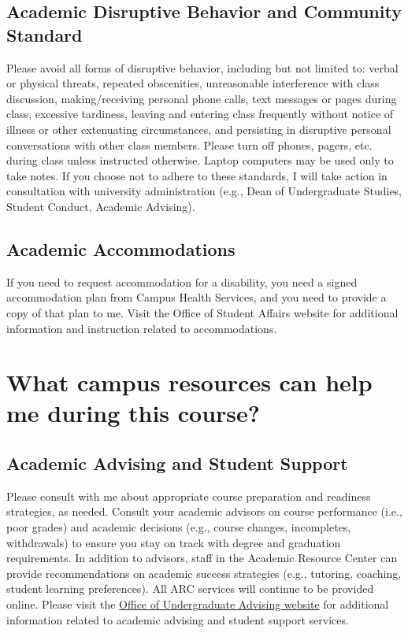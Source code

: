 \documentclass[11pt]{article}
\begin{document}
\subsection{Academic Disruptive Behavior and Community Standard}

Please avoid all forms of disruptive behavior, including but not limited to: verbal or physical threats, repeated obscenities, unreasonable interference with class discussion, making/receiving personal phone calls, text messages or pages during class, excessive tardiness, leaving and entering class frequently without notice of illness or other extenuating circumstances, and persisting in disruptive personal conversations with other class members.  Please turn off phones, pagers, etc. during class unless instructed otherwise.  Laptop computers may be used only to take notes. If you choose not to adhere to these standards, I will take action in consultation with university administration (e.g., Dean of Undergraduate Studies, Student Conduct, Academic Advising).

\subsection{Academic Accommodations}

If you need to request accommodation for a disability, you need a signed accommodation plan from Campus Health Services, and you need to provide a copy of that plan to me. Visit the Office of Student Affairs website for additional information and instruction related to accommodations. 



\section{What campus resources can help me during this course?}

\subsection{Academic Advising and Student Support}
Please consult with me about appropriate course preparation and readiness strategies, as needed.  Consult your academic advisors on course performance (i.e., poor grades) and academic decisions (e.g., course changes, incompletes, withdrawals) to ensure you stay on track with degree and graduation requirements. In addition to advisors, staff in the Academic Resource Center can provide recommendations on academic success strategies (e.g., tutoring, coaching, student learning preferences).  All ARC services will continue to be provided online. Please visit the \href{https://dukekunshan.edu.cn/en/academics/advising}{Office of Undergraduate Advising website} for additional information related to academic advising and student support services. 
\end{document}
